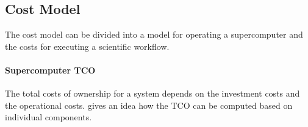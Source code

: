 \documentclass{../../template/esiwace-report}
\begin{document}








%
%
%


\subsection{Cost Model}

%

The cost model can be divided into a model for operating a supercomputer and the costs for executing a scientific workflow.

\paragraph{Supercomputer TCO}

The total costs of ownership for a system depends on the investment costs and the operational costs.
 gives an idea how the TCO can be computed based on individual components.
\end{document}
